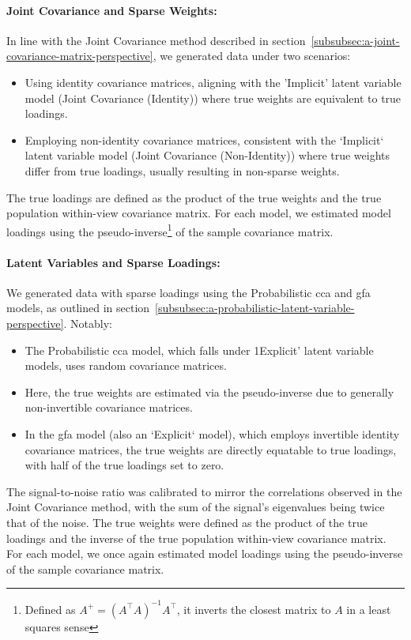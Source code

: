 \paragraph{Joint Covariance and Sparse Weights:}
In line with the Joint Covariance method described in section~\ref{subsubsec:a-joint-covariance-matrix-perspective}, we generated data under two scenarios:
\begin{itemize}
    \item Using identity covariance matrices, aligning with the 'Implicit' latent variable model (Joint Covariance (Identity)) where true weights are equivalent to true loadings.
    \item Employing non-identity covariance matrices, consistent with the `Implicit` latent variable model (Joint Covariance (Non-Identity)) where true weights differ from true loadings, usually resulting in non-sparse weights.
\end{itemize}
The true \gls{loadings} are defined as the product of the true weights and the true population within-view covariance matrix.
For each model, we estimated model \gls{loadings} using the pseudo-inverse\footnote{Defined as $A^+ = (A^\top A)^{-1} A^\top$, it inverts the closest matrix to $A$ in a least squares sense} of the sample covariance matrix.

\paragraph{Latent Variables and Sparse Loadings:}
We generated data with sparse \gls{loadings} using the Probabilistic \acrshort{cca} and \acrshort{gfa} models, as outlined in section~\ref{subsubsec:a-probabilistic-latent-variable-perspective}.
Notably:
\begin{itemize}
    \item The Probabilistic \acrshort{cca} model, which falls under 1Explicit' latent variable models, uses random covariance matrices. 
    \item Here, the true weights are estimated via the pseudo-inverse due to generally non-invertible covariance matrices.
    \item In the \acrshort{gfa} model (also an `Explicit` model), which employs invertible identity covariance matrices, the true weights are directly equatable to true loadings, with half of the true \gls{loadings} set to zero.
\end{itemize}
The signal-to-noise ratio was calibrated to mirror the correlations observed in the Joint Covariance method, with the sum of the signal's eigenvalues being twice that of the noise.
The true weights were defined as the product of the true \gls{loadings} and the inverse of the true population within-view covariance matrix.
For each model, we once again estimated model \gls{loadings} using the pseudo-inverse of the sample covariance matrix.

